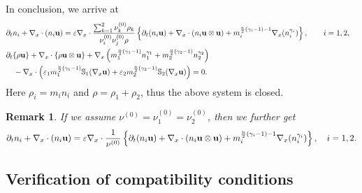\documentclass[10pt,reqno]{amsart}
\numberwithin{equation}{section}
\newtheorem{remark}{Remark}[section]
\newcommand{\e}{\varepsilon}
\newcommand{\lt}{\left}
\newcommand{\rt}{\right}
\newcommand{\pa}{\partial}
\begin{document}
In conclusion, we arrive at
\begin{align*}
&\pa_t n_i+\nabla_x\cdot (n_i {\bf{u}})=\varepsilon\nabla_x \cdot  \frac{\sum_{k=1}^2\nu_k^{(0)}\rho_k}{\nu_{i}^{(0)}\nu_{j}^{(0)}\rho }\left\{     \pa_t(n_i {\bf{u}}) +\nabla_x\cdot (n_i {\bf{u}}\otimes {\bf{u}}) +  m_i^{\frac n2(\gamma_i - 1)-1}\nabla_x (n_i^{\gamma_i}) \right\},\qquad i=1,2, \cr
&\pa_t\{\rho {\bf{u}}\}+ \nabla_x\cdot \left\{\rho {\bf{u}}\otimes {\bf{u}} \right\}+\nabla_x \left( m_1^{\frac{n}{2}(\gamma_1-1)}n_1^{\gamma_1}+m_2^{\frac{n}{2}(\gamma_2-1)}n_2^{\gamma_2} \right)\cr 
&\quad - \nabla_x \cdot \lt(\e_1 m_1^{\frac n2(\gamma_1 - 1)}\mathbb{S}_1(\nabla_x {\bf{u}}) + \e_2  m_2^{\frac n2(\gamma_2 - 1)}  \mathbb{S}_2(\nabla_x {\bf{u}})\rt) = 0.
\end{align*}
 Here $\rho_i=m_in_i$ and $\rho=\rho_1+\rho_2$, thus the above system is closed.
 
 \begin{remark} If we assume $\nu^{(0)}=\nu_1^{(0)}=\nu_2^{(0)}$, then we further get
$$
\pa_t n_i+\nabla_x\cdot (n_i {\bf{u}})=\varepsilon\nabla_x \cdot  \frac{1}{\nu^{(0)}}\left\{     \pa_t(n_i {\bf{u}}) +\nabla_x\cdot (n_i {\bf{u}}\otimes {\bf{u}}) +  m_i^{\frac n2(\gamma_i - 1)-1}\nabla_x (n_i^{\gamma_i}) \right\},\quad i=1,2.
$$
\end{remark}
 
 

 

\subsection{Verification of compatibility conditions}
\end{document}
